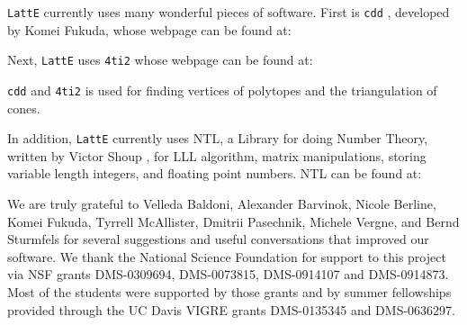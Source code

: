 \documentclass{article}
\newcommand{\latte}{{\tt LattE}\xspace}
\newcommand{\fourtitwo}{{\tt 4ti2}\xspace}
\begin{document}
\par {\tt LattE} currently uses many wonderful pieces of software.
First is {\tt cdd} \cite{fukuda}, developed by Komei Fukuda, whose webpage can be
found at:


Next, \latte uses \fourtitwo \cite{4ti2} whose webpage can be found at:


{\tt cdd} and \fourtitwo is used for finding vertices of polytopes and the
triangulation of cones.

In addition, {\tt LattE} currently uses NTL, a
Library for doing Number Theory, written by Victor Shoup \cite{shoup},
for LLL algorithm, matrix manipulations, storing variable length
integers, and floating point numbers.  NTL can be found at:


We are truly grateful to Velleda Baldoni, Alexander Barvinok, Nicole Berline, Komei Fukuda, Tyrrell McAllister, Dmitrii Pasechnik, Michele Vergne, and Bernd Sturmfels for several suggestions and
useful conversations that improved our software.  We thank the National
Science Foundation for support to this project via NSF grants DMS-0309694, 
DMS-0073815, DMS-0914107 and DMS-0914873. Most of the students were supported by those
grants and by summer fellowships provided through the UC Davis VIGRE grants
DMS-0135345 and DMS-0636297.





\end{document}
